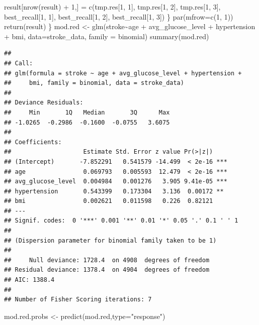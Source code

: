 \documentclass[
]{article}
\newenvironment{Shaded}{\begin{snugshade}}{\end{snugshade}}
\newcommand{\AttributeTok}[1]{\textcolor[rgb]{0.77,0.63,0.00}{#1}}
\newcommand{\DecValTok}[1]{\textcolor[rgb]{0.00,0.00,0.81}{#1}}
\newcommand{\FunctionTok}[1]{\textcolor[rgb]{0.00,0.00,0.00}{#1}}
\newcommand{\NormalTok}[1]{#1}
\newcommand{\OtherTok}[1]{\textcolor[rgb]{0.56,0.35,0.01}{#1}}
\newcommand{\SpecialCharTok}[1]{\textcolor[rgb]{0.00,0.00,0.00}{#1}}
\newcommand{\StringTok}[1]{\textcolor[rgb]{0.31,0.60,0.02}{#1}}
\begin{document}
\begin{Shaded}
\begin{Highlighting}[]
\NormalTok{    result[}\FunctionTok{nrow}\NormalTok{(result) }\SpecialCharTok{+} \DecValTok{1}\NormalTok{,] }\OtherTok{=} \FunctionTok{c}\NormalTok{(tmp.res[}\DecValTok{1}\NormalTok{, }\DecValTok{1}\NormalTok{], tmp.res[}\DecValTok{1}\NormalTok{, }\DecValTok{2}\NormalTok{], tmp.res[}\DecValTok{1}\NormalTok{, }\DecValTok{3}\NormalTok{], }
\NormalTok{                                  best\_recall[}\DecValTok{1}\NormalTok{, }\DecValTok{1}\NormalTok{], best\_recall[}\DecValTok{1}\NormalTok{, }\DecValTok{2}\NormalTok{], best\_recall[}\DecValTok{1}\NormalTok{, }\DecValTok{3}\NormalTok{])}
\NormalTok{  \}}
  \FunctionTok{par}\NormalTok{(}\AttributeTok{mfrow=}\FunctionTok{c}\NormalTok{(}\DecValTok{1}\NormalTok{, }\DecValTok{1}\NormalTok{))}
  \FunctionTok{return}\NormalTok{(result)}
\NormalTok{\}}
\NormalTok{mod.red }\OtherTok{\textless{}{-}} \FunctionTok{glm}\NormalTok{(stroke}\SpecialCharTok{\textasciitilde{}}\NormalTok{age }\SpecialCharTok{+}\NormalTok{ avg\_glucose\_level }\SpecialCharTok{+}\NormalTok{ hypertension }\SpecialCharTok{+}\NormalTok{ bmi, }\AttributeTok{data=}\NormalTok{stroke\_data, }
               \AttributeTok{family =}\NormalTok{ binomial)}
\FunctionTok{summary}\NormalTok{(mod.red)}
\end{Highlighting}
\end{Shaded}

\begin{verbatim}
## 
## Call:
## glm(formula = stroke ~ age + avg_glucose_level + hypertension + 
##     bmi, family = binomial, data = stroke_data)
## 
## Deviance Residuals: 
##     Min       1Q   Median       3Q      Max  
## -1.0265  -0.2986  -0.1600  -0.0755   3.6075  
## 
## Coefficients:
##                    Estimate Std. Error z value Pr(>|z|)    
## (Intercept)       -7.852291   0.541579 -14.499  < 2e-16 ***
## age                0.069793   0.005593  12.479  < 2e-16 ***
## avg_glucose_level  0.004984   0.001276   3.905 9.41e-05 ***
## hypertension       0.543399   0.173304   3.136  0.00172 ** 
## bmi                0.002621   0.011598   0.226  0.82121    
## ---
## Signif. codes:  0 '***' 0.001 '**' 0.01 '*' 0.05 '.' 0.1 ' ' 1
## 
## (Dispersion parameter for binomial family taken to be 1)
## 
##     Null deviance: 1728.4  on 4908  degrees of freedom
## Residual deviance: 1378.4  on 4904  degrees of freedom
## AIC: 1388.4
## 
## Number of Fisher Scoring iterations: 7
\end{verbatim}

\begin{Shaded}
\begin{Highlighting}[]
\NormalTok{mod.red.probs }\OtherTok{\textless{}{-}} \FunctionTok{predict}\NormalTok{(mod.red,}\AttributeTok{type=}\StringTok{"response"}\NormalTok{)}
\end{Highlighting}
\end{Shaded}
\end{document}
